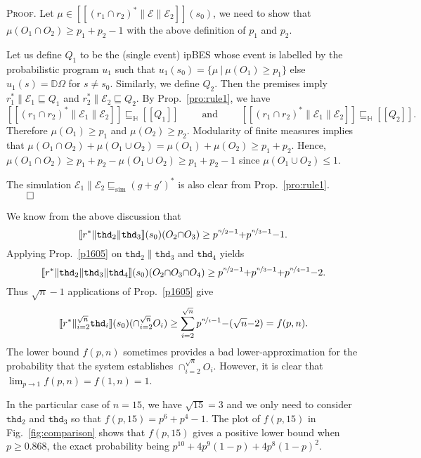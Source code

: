 \documentclass[review]{elsart}
\newenvironment{proof}{\par
\noindent
\textsc{Proof. }
\noindent}{\hfill\(\qed\)}
\newcommand{\D}{\mathbb{D}}
\newcommand{\EE}{\mathcal{E}}
\newcommand{\sem}[1]{[\![#1]\!]}
\newcommand{\bks}{*}
\newcommand{\refby}{\sqsubseteq}
\newcommand{\refbyh}{\sqsubseteq_{\mathbb{H}}}
\newcommand{\simref}{\refby_{\mathrm{sim}}}
\newcommand{\thread}{\mathtt{thd}}
\newcommand{\Prop}[1]{Prop.~\ref{#1}}
\newcommand{\Fig}[1]{Fig.~\ref{#1}}
\begin{document}
\begin{proof}
Let $\mu\in\sem{(r_1{\cap} r_2)^*\|\EE\|\EE_2}(s_0)$, we need to show that $\mu(O_1{\cap} O_2)\geq p_1{+}p_2{-}1$ with the above definition of $p_1$ and $p_2$. 
 
Let us define $Q_1$ to be the (single event) ipBES whose event is labelled by the probabilistic program $u_1$ such that $u_1(s_0) = \{\mu\ |\ \mu(O_1){\geq} p_1\}$ else $u_1(s) = \D\Omega$ for $s\neq s_0$. Similarly, we define $Q_2$. Then the premises imply $r_1^*\| \EE_1\refby Q_1$ and 
$r_2^*\|\EE_2\refby Q_2$. By \Prop{pro:rule1}, we have \[
	\sem{(r_1{\cap} r_2)^*\|\EE_1\|\EE_2}\refbyh \sem{Q_1}\qquad \textrm{ and }\qquad \sem{(r_1{\cap} r_2)^*\|\EE_1\|\EE_2}\refbyh \sem{Q_2}.
\]
Therefore $\mu(O_1)\geq p_1$ and $\mu(O_2)\geq p_2$. Modularity of finite measures implies that $\mu(O_1{\cap} O_2) {+} \mu(O_1{\cup} O_2) = \mu(O_1) {+} \mu(O_2)\geq p_1 {+} p_2$. Hence, $\mu(O_1{\cap} O_2)\geq p_1 {+} p_2 {-} \mu(O_1{\cup} O_2)\geq p_1 {+} p_2 {-} 1$ since $\mu(O_1{\cup}O_2)\leq 1$.

The simulation $\EE_1\|\EE_2\simref (g{+} g')^{\bks}$ is also clear from \Prop{pro:rule1}.
\end{proof}

We know from the above discussion that 
\[
	\sem{r^{\bks}\|\thread_2\|\thread_3}(s_0)(O_2{\cap} O_3)\geq p^{\nicefrac{n}{2}{-}1} {+} p^{\nicefrac{n}{3}{-}1} {-} 1.
\]
Applying \Prop{p1605} on $\thread_2\|\thread_3$ and $\thread_4$ yields
\[
	\sem{r^{\bks}\|\thread_2\|\thread_3\|\thread_4}(s_0)(O_2{\cap} O_3{\cap}O_4)\geq p^{\nicefrac{n}{2}{-}1} {+} p^{\nicefrac{n}{3}{-}1} {+}p^{\nicefrac{n}{4}{-}1}{-} 2.
\]
Thus $\sqrt n{-}1$ applications of \Prop{p1605} give 
\[
	\sem{r^{\bks}\|_{i=2}^{\sqrt n}\thread_i}(s_0)({\cap}_{i=2}^{\sqrt n} O_i) \geq \sum_{i=2}^{\sqrt n} p^{\nicefrac{n}{i}{-}1} {-} (\sqrt n{-}2) = f(p,n).
\]
The lower bound $f(p,n)$ sometimes provides a bad lower-approximation for the probability that the system establishes ${\cap}_{i=2}^{\sqrt n}O_i$. However, it is clear that $\lim_{p{\to} 1}f(p,n) = f(1,n) = 1$. 

In the particular case of $n=15$, we have $\sqrt{15} = 3$ and we only need to consider $\thread_2$ and $\thread_3$ so that $f(p,15) = p^6 {+} p^4 {-} 1$. The plot of $f(p,15)$ in \Fig{fig:comparison} shows that $f(p,15)$ gives a positive lower bound when $p\geq 0.868$, the exact probability being $p^{10} {+} 4p^9(1{-}p) {+} 4p^8(1{-}p)^2$. 

\end{document}
